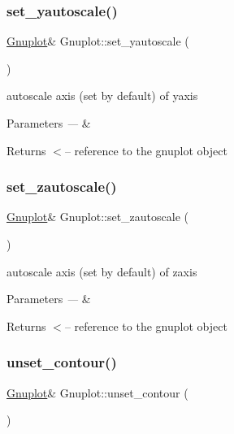\subsubsection{\texorpdfstring{set\+\_\+yautoscale()}{set\_yautoscale()}}
{\footnotesize\ttfamily \mbox{\hyperlink{class_gnuplot}{Gnuplot}}\& Gnuplot\+::set\+\_\+yautoscale (\begin{DoxyParamCaption}{ }\end{DoxyParamCaption})\hspace{0.3cm}{\ttfamily [inline]}}

autoscale axis (set by default) of yaxis


\begin{DoxyParams}{Parameters}
{\em ---} & \\
\hline
\end{DoxyParams}
\begin{DoxyReturn}{Returns}
$<$-- reference to the gnuplot object 
\end{DoxyReturn}
\mbox{\label{class_gnuplot_aef3e84e793836158e1ddd773d1465c37}} 
\subsubsection{\texorpdfstring{set\+\_\+zautoscale()}{set\_zautoscale()}}
{\footnotesize\ttfamily \mbox{\hyperlink{class_gnuplot}{Gnuplot}}\& Gnuplot\+::set\+\_\+zautoscale (\begin{DoxyParamCaption}{ }\end{DoxyParamCaption})\hspace{0.3cm}{\ttfamily [inline]}}

autoscale axis (set by default) of zaxis


\begin{DoxyParams}{Parameters}
{\em ---} & \\
\hline
\end{DoxyParams}
\begin{DoxyReturn}{Returns}
$<$-- reference to the gnuplot object 
\end{DoxyReturn}
\mbox{\label{class_gnuplot_a0b8522cb81e46dd4f5a22b7b48f977b1}} 
\subsubsection{\texorpdfstring{unset\+\_\+contour()}{unset\_contour()}}
{\footnotesize\ttfamily \mbox{\hyperlink{class_gnuplot}{Gnuplot}}\& Gnuplot\+::unset\+\_\+contour (\begin{DoxyParamCaption}{ }\end{DoxyParamCaption})\hspace{0.3cm}{\ttfamily [inline]}}

